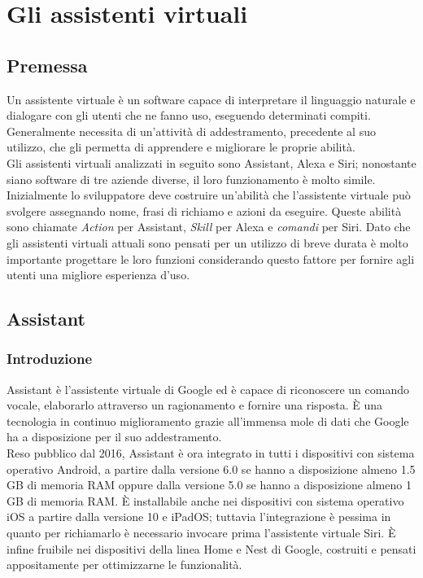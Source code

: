 
\chapter{Gli assistenti virtuali}
\label{cap:descrizione-stage}


\section{Premessa}
Un assistente virtuale è un software capace di interpretare il linguaggio naturale e dialogare con gli utenti che ne fanno uso, eseguendo determinati compiti. Generalmente necessita di un'attività di addestramento, precedente al suo utilizzo, che gli permetta di apprendere e migliorare le proprie abilità. \\
Gli assistenti virtuali analizzati in seguito sono Assistant, Alexa e Siri; nonostante siano software di tre aziende diverse, il loro funzionamento è molto simile. Inizialmente lo sviluppatore deve costruire un'abilità che l'assistente virtuale può svolgere assegnando nome, frasi di richiamo e azioni da eseguire. Queste abilità sono chiamate \textit{Action} per Assistant, \textit{Skill} per Alexa e \textit{comandi} per Siri. Dato che gli assistenti virtuali attuali sono pensati per un utilizzo di breve durata è molto importante progettare le loro funzioni considerando questo fattore per fornire agli utenti una migliore esperienza d'uso. \\

\section{Assistant}
	\subsection{Introduzione}
	Assistant è l'assistente virtuale di Google ed è capace di riconoscere un comando vocale, elaborarlo attraverso un ragionamento e fornire una risposta. È una tecnologia in continuo miglioramento grazie all'immensa mole di dati che Google ha a disposizione per il suo addestramento. \\
	Reso pubblico dal 2016, Assistant è ora integrato in tutti i dispositivi con sistema operativo Android, a partire dalla versione 6.0 se hanno a disposizione almeno 1.5 GB di memoria RAM oppure dalla versione 5.0 se hanno a disposizione almeno 1 GB di memoria RAM. È installabile anche nei dispositivi con sistema operativo iOS a partire dalla versione 10 e iPadOS; tuttavia l'integrazione è pessima in quanto per richiamarlo è necessario invocare prima l'assistente virtuale Siri. È infine fruibile nei dispositivi della linea Home e Nest di Google, costruiti e pensati appositamente per ottimizzarne le funzionalità.
